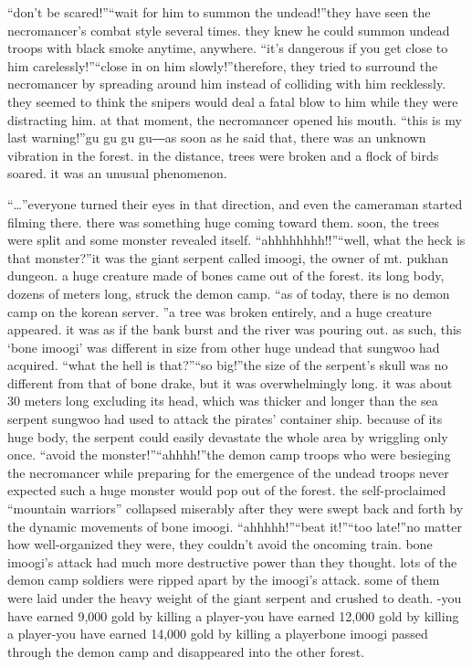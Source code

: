“don’t be scared!”“wait for him to summon the undead!”they have seen the necromancer’s combat style several times.
 they knew he could summon undead troops with black smoke anytime, anywhere.
“it’s dangerous if you get close to him carelessly!”“close in on him slowly!”therefore, they tried to surround the necromancer by spreading around him instead of colliding with him recklessly.
they seemed to think the snipers would deal a fatal blow to him while they were distracting him.
at that moment, the necromancer opened his mouth.
“this is my last warning!”gu gu gu gu―as soon as he said that, there was an unknown vibration in the forest.
 in the distance, trees were broken and a flock of birds soared.
 it was an unusual phenomenon.

“…”everyone turned their eyes in that direction, and even the cameraman started filming there.
there was something huge coming toward them.
soon, the trees were split and some monster revealed itself.
“ahhhhhhhh!!”“well, what the heck is that monster?”it was the giant serpent called imoogi, the owner of mt.
 pukhan dungeon.
 a huge creature made of bones came out of the forest.
its long body, dozens of meters long, struck the demon camp.
“as of today, there is no demon camp on the korean server.
”a tree was broken entirely, and a huge creature appeared.
 it was as if the bank burst and the river was pouring out.
as such, this ‘bone imoogi’ was different in size from other huge undead that sungwoo had acquired.
“what the hell is that?”“so big!”the size of the serpent’s skull was no different from that of bone drake, but it was overwhelmingly long.
it was about 30 meters long excluding its head, which was thicker and longer than the sea serpent sungwoo had used to attack the pirates’ container ship.
because of its huge body, the serpent could easily devastate the whole area by wriggling only once.
“avoid the monster!”“ahhhh!”the demon camp troops who were besieging the necromancer while preparing for the emergence of the undead troops never expected such a huge monster would pop out of the forest.
the self-proclaimed “mountain warriors” collapsed miserably after they were swept back and forth by the dynamic movements of bone imoogi.
“ahhhhh!”“beat it!”“too late!”no matter how well-organized they were, they couldn’t avoid the oncoming train.
 bone imoogi’s attack had much more destructive power than they thought.
lots of the demon camp soldiers were ripped apart by the imoogi’s attack.
 some of them were laid under the heavy weight of the giant serpent and crushed to death.
-you have earned 9,000 gold by killing a player-you have earned 12,000 gold by killing a player-you have earned 14,000 gold by killing a playerbone imoogi passed through the demon camp and disappeared into the other forest.
